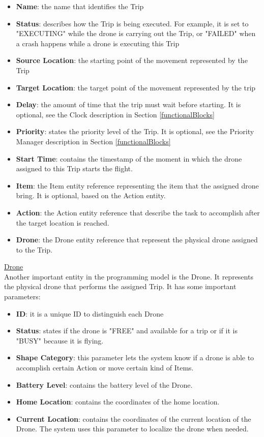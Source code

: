 \begin{itemize}
\item{\textbf{Name}: the name that identifies the Trip}
\item{\textbf{Status}: describes how the Trip is being executed. For example, it is set to "EXECUTING" while the drone is carrying out the Trip, or "FAILED" when a crash happens while a drone is executing this Trip}
\item{\textbf{Source Location}: the starting point of the movement represented by the Trip}
\item{\textbf{Target Location}: the target point of the movement represented by the trip}
\item{\textbf{Delay}: the amount of time that the trip must wait before starting.  It is optional, see the Clock description in Section \ref{functionalBlocks}}
\item{\textbf{Priority}: states the priority level of the Trip.  It is optional, see the Priority Manager description in Section \ref{functionalBlocks}}
\item{\textbf{Start Time}: contains the timestamp of the moment in which the drone assigned to this Trip starts the flight.}
\item{\textbf{Item}: the Item entity reference representing the item that the assigned drone bring. It is optional, based on the Action entity.}
\item{\textbf{Action}: the Action entity reference that describe the task to accomplish after the target location is reached.}
\item{\textbf{Drone}: the Drone entity reference that represent the physical drone assigned to the Trip.}
\end{itemize}

\underline{Drone}
\\

Another important entity in the programming model is the Drone. It represents the physical drone that performs the assigned Trip. It has some important parameters:

\begin{itemize}
\item{\textbf{ID}: it is a unique ID to distinguish each Drone}
\item{\textbf{Status}: states if the drone is "FREE" and available for a trip or if it is "BUSY" because it is flying.}
\item{\textbf{Shape Category}: this parameter lets the system know if a drone is able to accomplish certain Action or move certain kind of Items.}
\item{\textbf{Battery Level}: contains the battery level of the Drone.}
\item{\textbf{Home Location}: contains the coordinates of the home location.}
\item{\textbf{Current Location}: contains the coordinates of the current location of the Drone. The system uses this parameter to localize the drone when needed.}
\end{itemize}

